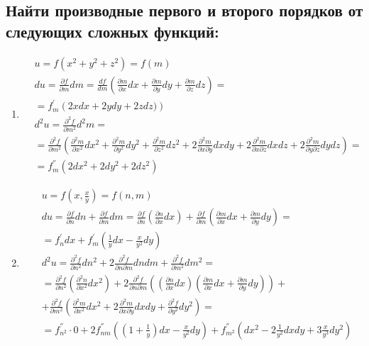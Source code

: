 \documentclass[a4paper, 12pt]{article}
\begin{document}
\subsection{Найти производные первого и второго порядков от следующих сложных функций:}
\begin{enumerate}
 \item %
 \begin{align*}
  &u = f(x^2+y^2+z^2) = f(m) \\
  &du = \frac{\partial f}{\partial m}dm = 
  \frac{df}{dm}\left(\frac{\partial m}{\partial x}dx +\frac{\partial m}{\partial y}dy
  +\frac{\partial m}{\partial z}dz\right) = \\
  &=f_m^{'}\left( 2xdx+2ydy+2zdz)\right) \\
  &d^2u = \frac{\partial^2 f}{\partial m^2}d^2m = \\
  &=\frac{\partial^2 f}{\partial m^2}\left(
  \frac{\partial^2 m}{\partial x^2}dx^2+\frac{\partial^2 m}{\partial y^2}dy^2
  +\frac{\partial^2 m}{\partial z^2}dz^2
  +2\frac{\partial^2 m}{\partial x \partial y}dxdy
  +2\frac{\partial^2 m}{\partial x \partial z}dxdz
  +2\frac{\partial^2 m}{\partial y \partial z}dydz
  \right) = \\
  &=f_m^{''}\left(2dx^2+2dy^2+2dz^2
  \right)
 \end{align*}
 
 \item %
 \begin{align*}
    &u = f(x, \frac{x}{y}) = f(n,m) \\
    &du = \frac{\partial f}{\partial n}dn + \frac{\partial f}{\partial m}dm = 
    \frac{\partial f}{\partial n}\left( \frac{\partial n}{\partial x}dx
    \right) + \frac{\partial f}{\partial m}\left(
    \frac{\partial m}{\partial x}dx + \frac{\partial m}{\partial y}dy
    \right) = \\
    &= f_n^{'}dx+f_m^{'}\left(\frac{1}{y}dx -\frac{x}{y^2}dy \right) \\
    &d^2u = \frac{\partial^2 f}{\partial n^2}dn^2 +
    2\frac{\partial^2 f}{\partial n \partial m}dndm+\frac{\partial^2 f}{\partial m^2}dm^2 = \\
    &= \frac{\partial^2 f}{\partial n^2}\left(\frac{\partial^2 n}{\partial x^2}dx^2\right) + 2\frac{\partial^2 f}{\partial n \partial m}\left(
    \left(\frac{\partial n}{\partial x}dx\right)\left(\frac{\partial m}{\partial x}dx + \frac{\partial m}{\partial y}dy\right)
    \right) + \\
    &+\frac{\partial^2 f}{\partial m^2}\left(
    \frac{\partial^2 m}{\partial x^2}dx^2+2\frac{\partial^2 m}{\partial x \partial y}dxdy + \frac{\partial^2 f}{\partial y^2}dy^2\right) = \\
    &= f_{n^2}^{''}\cdot0 + 2f_{nm}^{''}\left(\left(1+\frac{1}{y}\right)dx-\frac{x}{y^2}dy
    \right) + f_{m^2}^{''}\left(
    dx^2-2\frac{1}{y^2}dxdy+3\frac{x}{y^3}dy^2
    \right)
 \end{align*}
\end{enumerate}
\end{document}
